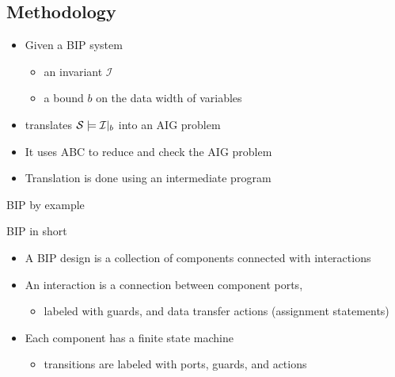 \subsection*{Methodology}

\begin{frame}{\biptool}
\begin{itemize}
 \item Given a BIP system \Pm
 \begin{itemize}
  \item an invariant $\mathcal{I}$
  \item a bound $b$ on the data width of variables 
 \end{itemize}
 \item \biptool{} translates $\mathcal{S} \models \mathcal{I}|_b$ into an  AIG problem
 \item It uses ABC to reduce and check the AIG problem
 \item Translation is done using an intermediate \thislanguage program \aigcircuit
\end{itemize}
\end{frame}

\begin{frame}{BIP by example}
\begin{figure}
\centering
\resizebox{0.8\textwidth}{!}{
  
}
\end{figure}
\end{frame}

\begin{frame}{BIP in short}
 \begin{itemize}
   \item A BIP design is a collection of components connected with interactions
   \item An interaction is a connection between component ports, 
   \begin{itemize} \item labeled with guards, and data transfer actions (assignment statements)\end{itemize}
   \item Each component has a finite state machine 
   \begin{itemize} \item transitions are labeled with ports, guards, and actions \end{itemize} 
 \end{itemize}
\end{frame}

